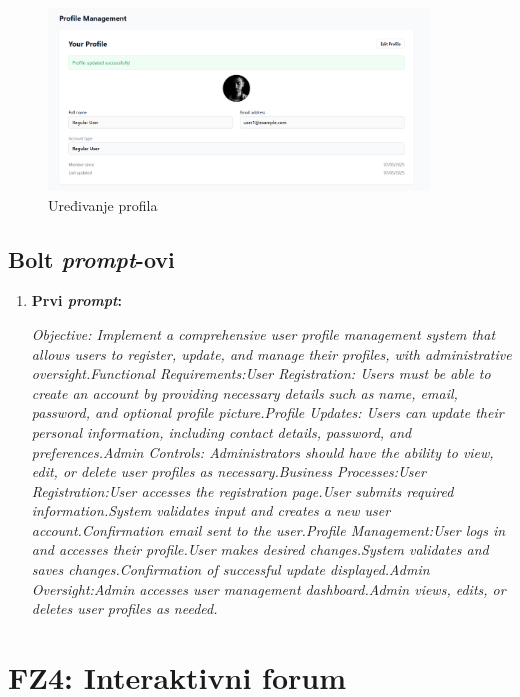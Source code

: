 \begin{figure}[H]
    \centering
    \includegraphics[width=0.9\textwidth]{Slike/fz3.10.png}
    \caption{Uređivanje profila}
    \label{fig:fz3.10}
\end{figure}

\subsection{Bolt \textit{prompt}-ovi}

\begin{enumerate}[itemsep=1ex]
    \item \textbf{Prvi \textit{prompt}:}

         \textit{Objective: Implement a comprehensive user profile management system that allows users to register, update, and manage their profiles, with administrative oversight.Functional Requirements:User Registration: Users must be able to create an account by providing necessary details such as name, email, password, and optional profile picture.Profile Updates: Users can update their personal information, including contact details, password, and preferences.Admin Controls: Administrators should have the ability to view, edit, or delete user profiles as necessary.Business Processes:User Registration:User accesses the registration page.User submits required information.System validates input and creates a new user account.Confirmation email sent to the user.Profile Management:User logs in and accesses their profile.User makes desired changes.System validates and saves changes.Confirmation of successful update displayed.Admin Oversight:Admin accesses user management dashboard.Admin views, edits, or deletes user profiles as needed.}
\end{enumerate}

\newpage  
\section{FZ4: Interaktivni forum}

